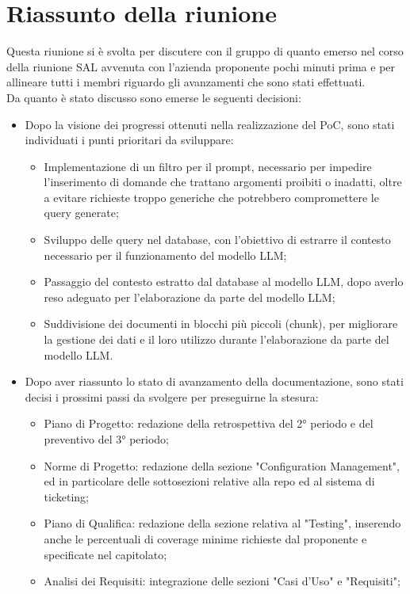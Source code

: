 \section{Riassunto della riunione}
Questa riunione si è svolta per discutere con il gruppo di quanto emerso nel corso della riunione SAL avvenuta con l’azienda proponente pochi minuti prima e per allineare tutti i membri riguardo gli avanzamenti che sono stati effettuati.\\
Da quanto è stato discusso sono emerse le seguenti decisioni:
\begin{itemize}
    \item Dopo la visione dei progressi ottenuti nella realizzazione del PoC, sono stati individuati i punti prioritari da sviluppare:
    \begin{itemize}
        \item Implementazione di un filtro per il prompt, necessario per impedire l'inserimento di domande che trattano argomenti proibiti o inadatti, oltre a evitare richieste troppo generiche che potrebbero compromettere le query generate;
        \item Sviluppo delle query nel database, con l'obiettivo di estrarre il contesto necessario per il funzionamento del modello LLM;
        \item Passaggio del contesto estratto dal database al modello LLM, dopo averlo reso adeguato per l'elaborazione da parte del modello LLM;
        \item Suddivisione dei documenti in blocchi più piccoli (chunk), per migliorare la gestione dei dati e il loro utilizzo durante l'elaborazione da parte del modello LLM.
    \end{itemize}
    \item Dopo aver riassunto lo stato di avanzamento della documentazione, sono stati decisi i prossimi passi da svolgere per preseguirne la stesura:
    \begin{itemize}
        \item Piano di Progetto: redazione della retrospettiva del 2° periodo e del preventivo del 3° periodo;
        \item Norme di Progetto: redazione della sezione "Configuration Management", ed in particolare delle sottosezioni relative alla repo ed al sistema di ticketing;
        \item Piano di Qualifica: redazione della sezione relativa al "Testing", inserendo anche le percentuali di coverage minime richieste dal proponente e specificate nel capitolato;
        \item Analisi dei Requisiti: integrazione delle sezioni "Casi d'Uso" e "Requisiti";

\end{itemize}
\end{itemize}
